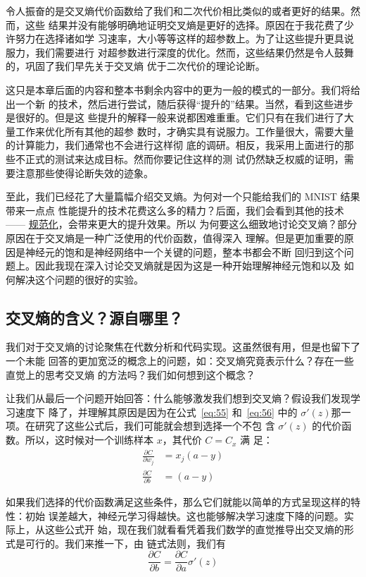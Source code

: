 令人振奋的是交叉熵代价函数给了我们和二次代价相比类似的或者更好的结果。然而，这些
结果并没有能够明确地证明交叉熵是更好的选择。原因在于我花费了少许努力在选择诸如学
习速率，\minibatch{}大小等等这样的超参数上。为了让这些提升更具说服力，我们需要进行
对超参数进行深度的优化。然而，这些结果仍然是令人鼓舞的，巩固了我们早先关于交叉熵
优于二次代价的理论论断。

这只是本章后面的内容和整本书剩余内容中的更为一般的模式的一部分。我们将给出一个新
的技术，然后进行尝试，随后获得“提升的”结果。当然，看到这些进步是很好的。但是这
些提升的解释一般来说都困难重重。它们只有在我们进行了大量工作来优化所有其他的超参
数时，才确实具有说服力。工作量很大，需要大量的计算能力，我们通常也不会进行这样彻
底的调研。相反，我采用上面进行的那些不正式的测试来达成目标。然而你要记住这样的测
试仍然缺乏权威的证明，需要注意那些使得论断失效的迹象。

至此，我们已经花了大量篇幅介绍交叉熵。为何对一个只能给我们的 MNIST 结果带来一点点
性能提升的技术花费这么多的精力？后面，我们会看到其他的技术 ——
\hyperref[sec:overfitting_and_regularization]{规范化}，会带来更大的提升效果。所以
为何要这么细致地讨论交叉熵？部分原因在于交叉熵是一种广泛使用的代价函数，值得深入
理解。但是更加重要的原因是神经元的饱和是神经网络中一个关键的问题，整本书都会不断
回归到这个问题上。因此我现在深入讨论交叉熵就是因为这是一种开始理解神经元饱和以及
如何解决这个问题的很好的实验。

\subsection{交叉熵的含义？源自哪里？}

我们对于交叉熵的讨论聚焦在代数分析和代码实现。这虽然很有用，但是也留下了一个未能
回答的更加宽泛的概念上的问题，如：交叉熵究竟表示什么？存在一些直觉上的思考交叉熵
的方法吗？我们如何想到这个概念？

让我们从最后一个问题开始回答：什么能够激发我们想到交叉熵？假设我们发现学习速度下
降了，并理解其原因是因为在公式~\eqref{eq:55} 和~\eqref{eq:56} 中的
$\sigma'(z)$那一项。在研究了这些公式后，我们可能就会想到选择一个不包
含 $\sigma'(z)$ 的代价函数。所以，这时候对一个训练样本 $x$，其代价 $C = C_x$ 满
足：
\begin{align}
  \frac{\partial C}{\partial w_j} &= x_j(a-y) \label{eq:71}\tag{71}\\
  \frac{\partial C}{\partial b } &= (a-y) \label{eq:72}\tag{72}
\end{align}

如果我们选择的代价函数满足这些条件，那么它们就能以简单的方式呈现这样的特性：初始
误差越大，神经元学习得越快。这也能够解决学习速度下降的问题。实际上，从这些公式开
始，现在我们就看看凭着我们数学的直觉推导出交叉熵的形式是可行的。我们来推一下，由
链式法则，我们有
\begin{equation}
  \frac{\partial C}{\partial b} = \frac{\partial C}{\partial a}
  \sigma'(z)
  \tag{73}
\end{equation}

